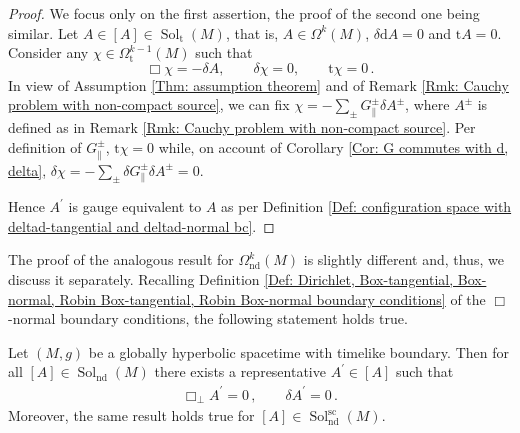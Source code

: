 \begin{proof}
	We focus only on the first assertion, the proof of the second one being similar.
	Let $A\in[A]\in\operatorname{Sol}_{\mathrm{t}}(M)$, that is, $A\in\Omega^k(M)$, $\delta\mathrm{d}A=0$ and $\mathrm{t}A=0$.
	Consider any $\chi\in\Omega^{k-1}_{\mathrm{t}}(M)$ such that 
	\begin{equation}\label{Eqn: gauge fixing}
	\Box\chi=-\delta A,\qquad\delta\chi=0,\qquad \mathrm{t}\chi=0\,.
	\end{equation}
	In view of Assumption \ref{Thm: assumption theorem} and of Remark \ref{Rmk: Cauchy problem with non-compact source}, we can fix $\chi=-\sum_\pm G_\parallel^\pm\delta A^\pm$, where $A^\pm$ is defined as in Remark \ref{Rmk: Cauchy problem with non-compact source}.
	Per definition of $G_\parallel^\pm$, $\mathrm{t}\chi=0$ while, on account of Corollary \ref{Cor: G commutes with d, delta}, $\delta\chi=-\sum_\pm\delta G_\parallel^\pm\delta A^\pm=0$.
	
	
	Hence $A^\prime$ is gauge equivalent to $A$ as per Definition \ref{Def: configuration space with deltad-tangential and deltad-normal bc}.
\end{proof}

\noindent
The proof of the analogous result for $\Omega^k_{\mathrm{nd}}(M)$ is slightly different and, thus, we discuss it separately. Recalling Definition \ref{Def: Dirichlet, Box-tangential, Box-normal, Robin Box-tangential, Robin Box-normal boundary conditions} of the $\Box$-normal boundary conditions, the following statement holds true.

\begin{proposition}\label{Prop: Lorentz gauge for deltad-normal bc}
	Let $(M,g)$ be a globally hyperbolic spacetime with timelike boundary. Then for all $[A]\in\operatorname{Sol}_{\mathrm{nd}}(M)$ there exists a representative $A^\prime\in[A]$ such that
	\begin{align}\label{Eqn: system of sins 2}
	\Box_\perp A^\prime=0\,,\qquad
	\delta A^\prime=0\,.
	\end{align}
	Moreover, the same result holds true for $[A]\in\operatorname{Sol}_{\mathrm{nd}}^{\mathrm{sc}}(M)$.
\end{proposition}

